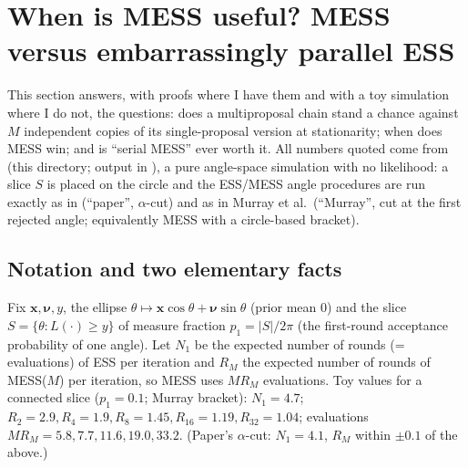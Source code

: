 \documentclass[11pt,a4paper]{article}
\theoremstyle{remark}
\newcommand{\bx}{\bm{x}}
\newcommand{\bnu}{\bm{\nu}}
\begin{document}
\section{When is MESS useful? MESS versus embarrassingly parallel ESS}\label{sec:useful}
This section answers, with proofs where I have them and with a toy simulation where I do not, the questions: does a multiproposal chain stand a chance against $M$ independent copies of its single-proposal version at stationarity; when does MESS win; and is ``serial MESS'' ever worth it. All numbers quoted come from  (this directory; output in ), a pure angle-space simulation with no likelihood: a slice $S$ is placed on the circle and the ESS/MESS angle procedures are run exactly as in  (``paper'', $\alpha$-cut) and as in Murray et al.\ (``Murray'', cut at the first rejected angle; equivalently MESS with a circle-based bracket).

\subsection{Notation and two elementary facts}
Fix $\bx,\bnu,y$, the ellipse $\theta\mapsto\bx\cos\theta+\bnu\sin\theta$ (prior mean $0$) and the slice $S=\{\theta:L(\cdot)\ge y\}$ of measure fraction $p_1=|S|/2\pi$ (the first-round acceptance probability of one angle). Let $N_1$ be the expected number of rounds (= evaluations) of ESS per iteration and $R_M$ the expected number of rounds of MESS($M$) per iteration, so MESS uses $MR_M$ evaluations. Toy values for a connected slice ($p_1=0.1$; Murray bracket): $N_1=4.7$; $R_2=2.9,R_4=1.9,R_8=1.45,R_{16}=1.19,R_{32}=1.04$; evaluations $MR_M=5.8,7.7,11.6,19.0,33.2$. (Paper's $\alpha$-cut: $N_1=4.1$, $R_M$ within $\pm0.1$ of the above.)
\end{document}
